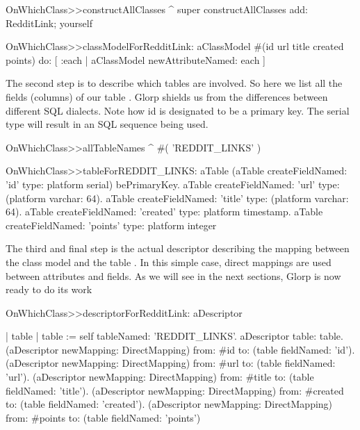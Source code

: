\documentclass[a4paper,10pt,twoside]{book}
\begin{document}
\begin{code}{}
OnWhichClass>>constructAllClasses
    ^ super constructAllClasses add: RedditLink; yourself

OnWhichClass>>classModelForRedditLink: aClassModel
    #(id url title created points) do: [ :each | aClassModel newAttributeNamed: each ]
\end{code}

The second step is to describe which tables are involved. So here we list all the fields (columns) of our table . Glorp shields us from the differences between different SQL dialects. Note how id is designated to be a primary key. The serial type will result in an SQL sequence being used. 

\begin{code}{}
OnWhichClass>>allTableNames
     ^ #( 'REDDIT_LINKS' )

OnWhichClass>>tableForREDDIT_LINKS: aTable
     (aTable createFieldNamed: 'id' type: platform serial) bePrimaryKey. 
	aTable createFieldNamed: 'url' type: (platform varchar: 64). 
	aTable createFieldNamed: 'title' type: (platform varchar: 64). 
	aTable createFieldNamed: 'created' type: platform timestamp.
	aTable createFieldNamed: 'points' type: platform integer
\end{code}

The third and final step is the actual descriptor describing the mapping between the class model  and the table . In this simple case, direct mappings are used between attributes and fields. As we will see in the next sections, Glorp is now ready to do its work

\begin{code}{}
OnWhichClass>>descriptorForRedditLink: aDescriptor

	| table | 
	table := self tableNamed: 'REDDIT_LINKS'. 
	aDescriptor table: table. (aDescriptor newMapping: DirectMapping) from: #id to: (table fieldNamed: 'id'). 
	(aDescriptor newMapping: DirectMapping) from: #url to: (table fieldNamed: 'url'). 
	(aDescriptor newMapping: DirectMapping) from: #title to: (table fieldNamed: 'title'). 
	(aDescriptor newMapping: DirectMapping) from: #created to: (table fieldNamed: 'created'). 
	(aDescriptor newMapping: DirectMapping) from: #points to: (table fieldNamed: 'points')
\end{code}

\section{}
\end{document}
